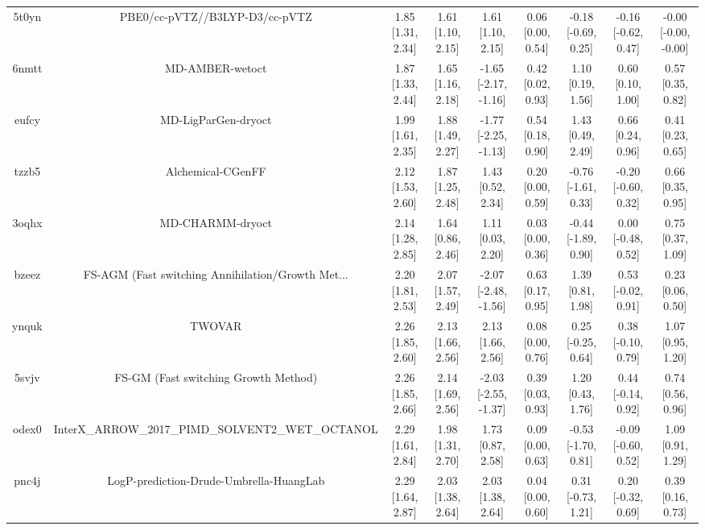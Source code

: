 \documentclass{article}
\begin{document}
\begin{center}
\begin{longtable}{|ccccccccc|}
 5t0yn &                     PBE0/cc-pVTZ//B3LYP-D3/cc-pVTZ &  1.85 [1.31, 2.34] &  1.61 [1.10, 2.15] &     1.61 [1.10, 2.15] &  0.06 [0.00, 0.54] &  -0.18 [-0.69, 0.25] &  -0.16 [-0.62, 0.47] &  -0.00 [-0.00, -0.00] \\
 6nmtt &                                    MD-AMBER-wetoct &  1.87 [1.33, 2.44] &  1.65 [1.16, 2.18] &  -1.65 [-2.17, -1.16] &  0.42 [0.02, 0.93] &    1.10 [0.19, 1.56] &    0.60 [0.10, 1.00] &     0.57 [0.35, 0.82] \\
 eufcy &                                MD-LigParGen-dryoct &  1.99 [1.61, 2.35] &  1.88 [1.49, 2.27] &  -1.77 [-2.25, -1.13] &  0.54 [0.18, 0.90] &    1.43 [0.49, 2.49] &    0.66 [0.24, 0.96] &     0.41 [0.23, 0.65] \\
 tzzb5 &                                  Alchemical-CGenFF &  2.12 [1.53, 2.60] &  1.87 [1.25, 2.48] &     1.43 [0.52, 2.34] &  0.20 [0.00, 0.59] &  -0.76 [-1.61, 0.33] &  -0.20 [-0.60, 0.32] &     0.66 [0.35, 0.95] \\
 3oqhx &                                   MD-CHARMM-dryoct &  2.14 [1.28, 2.85] &  1.64 [0.86, 2.46] &     1.11 [0.03, 2.20] &  0.03 [0.00, 0.36] &  -0.44 [-1.89, 0.90] &   0.00 [-0.48, 0.52] &     0.75 [0.37, 1.09] \\
 bzeez &  FS-AGM (Fast switching Annihilation/Growth Met... &  2.20 [1.81, 2.53] &  2.07 [1.57, 2.49] &  -2.07 [-2.48, -1.56] &  0.63 [0.17, 0.95] &    1.39 [0.81, 1.98] &   0.53 [-0.02, 0.91] &     0.23 [0.06, 0.50] \\
 ynquk &                                             TWOVAR &  2.26 [1.85, 2.60] &  2.13 [1.66, 2.56] &     2.13 [1.66, 2.56] &  0.08 [0.00, 0.76] &   0.25 [-0.25, 0.64] &   0.38 [-0.10, 0.79] &     1.07 [0.95, 1.20] \\
 5svjv &               FS-GM (Fast switching Growth Method) &  2.26 [1.85, 2.66] &  2.14 [1.69, 2.56] &  -2.03 [-2.55, -1.37] &  0.39 [0.03, 0.93] &    1.20 [0.43, 1.76] &   0.44 [-0.14, 0.92] &     0.74 [0.56, 0.96] \\
 odex0 &  InterX\_ARROW\_2017\_PIMD\_SOLVENT2\_WET\_OCTANOL &  2.29 [1.61, 2.84] &  1.98 [1.31, 2.70] &     1.73 [0.87, 2.58] &  0.09 [0.00, 0.63] &  -0.53 [-1.70, 0.81] &  -0.09 [-0.60, 0.52] &     1.09 [0.91, 1.29] \\
 pnc4j &            LogP-prediction-Drude-Umbrella-HuangLab &  2.29 [1.64, 2.87] &  2.03 [1.38, 2.64] &     2.03 [1.38, 2.64] &  0.04 [0.00, 0.60] &   0.31 [-0.73, 1.21] &   0.20 [-0.32, 0.69] &     0.39 [0.16, 0.73] \\

\end{longtable}
\end{center}
\end{document}
